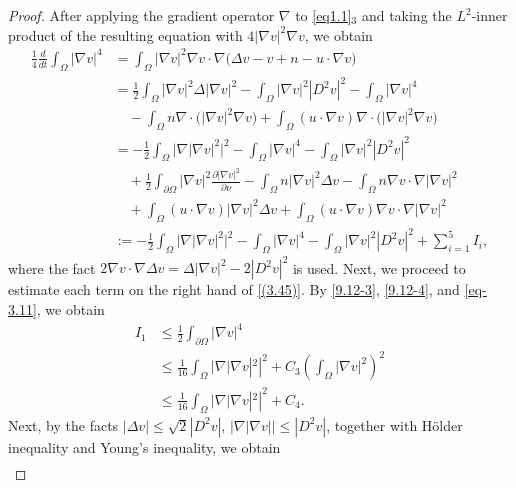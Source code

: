 \documentclass[reqno]{amsart}
\begin{document}
\begin{proof}
After applying the gradient operator $\nabla$ to \eqref{eq1.1}$_3$ and taking the 
$L^2$-inner product of the resulting equation with $4|\nabla v|^2\nabla v$, we obtain
\begin{equation}\label{(3.45)}
\begin{aligned}
\frac{1}{4} \frac{d}{dt}  \int_{\Omega} | \nabla v |^4
&= \int_{\Omega} |\nabla v|^2 \nabla v \cdot \nabla \bigl( \Delta v - v + n - u \cdot \nabla v \bigr) \\
&= \frac{1}{2} \int_{\Omega} |\nabla v|^2 \Delta |\nabla v|^2
  - \int_{\Omega} |\nabla v|^2 |D^2 v|^2
  - \int_{\Omega} |\nabla v|^4 \\
&\quad- \int_{\Omega} n \nabla \cdot \bigl( |\nabla v|^2 \nabla v \bigr)
  + \int_{\Omega} (u \cdot \nabla v) \nabla \cdot \bigl( |\nabla v|^2 \nabla v \bigr) \\
&= -\frac{1}{2} \int_{\Omega} \bigl| \nabla |\nabla v|^2 \bigr|^2- \int_{\Omega} |\nabla v|^4 - \int_{\Omega} |\nabla v|^2 |D^2 v|^2 \\
&\quad + \frac{1}{2} \int_{\partial \Omega} |\nabla v|^2 \frac{\partial |\nabla v|^2}{\partial \nu}
  - \int_{\Omega} n |\nabla v|^2 \Delta v
  - \int_{\Omega} n \nabla v \cdot \nabla |\nabla v|^2\\
&\quad+ \int_{\Omega} (u \cdot \nabla v) |\nabla v|^2 \Delta v
  + \int_{\Omega} (u \cdot \nabla v) \nabla v \cdot \nabla |\nabla v|^2\\&:=-\frac{1}{2} \int_{\Omega} \bigl| \nabla |\nabla v|^2 \bigr|^2-
  \int_{\Omega} |\nabla v|^4 - \int_{\Omega} |\nabla v|^2 |D^2 v|^2 +\sum_{i=1}^{5}I_i,
\end{aligned}
\end{equation}
where the fact $ 2\nabla v \cdot \nabla \Delta v = \Delta | \nabla v |^2
- 2 | D^2 v |^2 $ is used.
Next, we proceed to estimate each term on the right hand of \eqref{(3.45)}. 
By \eqref{9.12-3}, \eqref{9.12-4}, and \eqref{eq-3.11}, we obtain
\begin{align*}
I_1 &\leq \frac{1}{2}\int_{\partial \Omega} |\nabla v|^4  \\ &\leq \frac{1}{16}\int_{\Omega} |\nabla |\nabla v|^2|^2 + C_3\left(\int_{\Omega} |\nabla v|^2\right)^2
\\
&\leq \frac{1}{16}\int_{\Omega} |\nabla |\nabla v|^2|^2 + C_4.
\end{align*}
Next, by  the facts $ |\Delta v| \leq \sqrt{2} |D^2 v|$, 
$|\nabla|\nabla v||\leq |D^2 v|$, together with H\"{o}lder inequality and Young's 
inequality, we obtain
\begin{align*}

\end{align*}
\end{proof}
\end{document}
